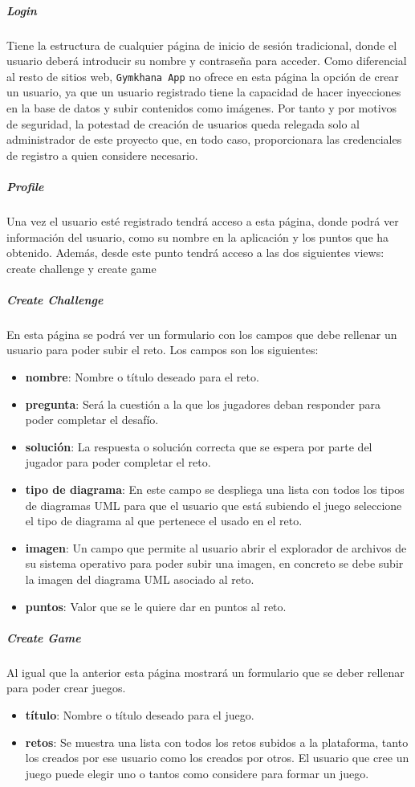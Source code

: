 \documentclass[a4paper, 12pt]{book}
\begin{document}
\subparagraph{Login}
Tiene la estructura de cualquier página de inicio de sesión tradicional, donde el usuario deberá introducir su nombre y contraseña para acceder. Como diferencial al resto de sitios web, \texttt{Gymkhana App} no ofrece en esta página la opción de crear un usuario, ya que un usuario registrado tiene la capacidad de hacer inyecciones en la base de datos y subir contenidos como imágenes. Por tanto y por motivos de seguridad, la potestad de creación de usuarios queda relegada solo al administrador de este proyecto que, en todo caso, proporcionara las credenciales de registro a quien considere necesario.   

\subparagraph{Profile} Una vez el usuario esté registrado tendrá acceso a esta página, donde podrá ver información del usuario, como su nombre en la aplicación y los puntos que ha obtenido. Además, desde este punto tendrá acceso a las dos siguientes views: create challenge y create game

\subparagraph{Create Challenge} En esta página se podrá ver un formulario con los campos que debe rellenar un usuario para poder subir el reto. Los campos son los siguientes:
\begin{itemize}
	\item \textbf {nombre}: Nombre o título deseado para el reto.
	\item \textbf {pregunta}: Será la cuestión a la que los jugadores deban responder para poder completar el desafío.
	\item \textbf {solución}: La respuesta o solución correcta que se espera por parte del jugador para poder completar el reto.
	\item \textbf {tipo de diagrama}: En este campo se despliega una lista con todos los tipos de diagramas UML para que el usuario que está subiendo el juego seleccione el tipo de diagrama al que pertenece el usado en el reto.
	\item \textbf {imagen}: Un campo que permite al usuario abrir el explorador de archivos de su sistema operativo para poder subir una imagen, en concreto se debe subir la imagen del diagrama UML asociado al reto. 
	\item \textbf {puntos}: Valor que se le quiere dar en puntos al reto.
\end{itemize}	

\subparagraph{Create Game} Al igual que la anterior esta página mostrará un formulario que se deber rellenar para poder crear juegos. 
\begin{itemize}
	\item \textbf {título}: Nombre o título deseado para el juego.
	\item \textbf {retos}: Se muestra una lista con todos los retos subidos a la plataforma, tanto los creados por ese usuario como los creados por otros. El usuario que cree un juego puede elegir uno o tantos como considere para formar un juego. 
\end{itemize}	
\end{document}
